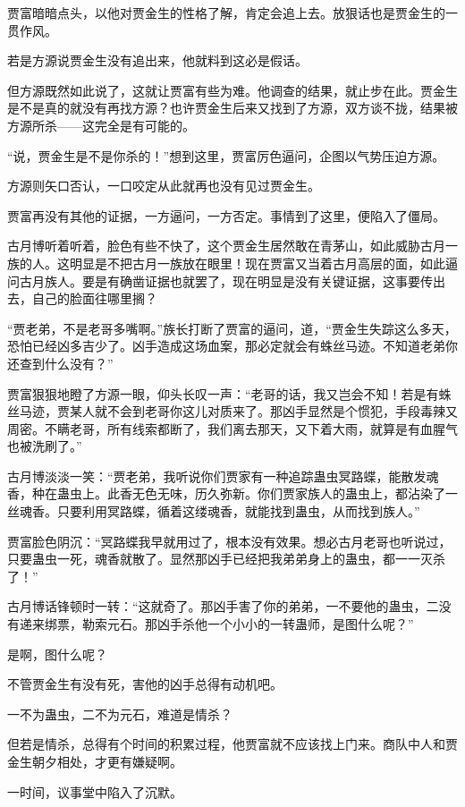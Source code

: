 \begin{this_body}
贾富暗暗点头，以他对贾金生的性格了解，肯定会追上去。放狠话也是贾金生的一贯作风。

若是方源说贾金生没有追出来，他就料到这必是假话。

但方源既然如此说了，这就让贾富有些为难。他调查的结果，就止步在此。贾金生是不是真的就没有再找方源？也许贾金生后来又找到了方源，双方谈不拢，结果被方源所杀——这完全是有可能的。

“说，贾金生是不是你杀的！”想到这里，贾富厉色逼问，企图以气势压迫方源。

方源则矢口否认，一口咬定从此就再也没有见过贾金生。

贾富再没有其他的证据，一方逼问，一方否定。事情到了这里，便陷入了僵局。

古月博听着听着，脸色有些不快了，这个贾金生居然敢在青茅山，如此威胁古月一族的人。这明显是不把古月一族放在眼里！现在贾富又当着古月高层的面，如此逼问古月族人。要是有确凿证据也就罢了，现在明显是没有关键证据，这事要传出去，自己的脸面往哪里搁？

“贾老弟，不是老哥多嘴啊。”族长打断了贾富的逼问，道，“贾金生失踪这么多天，恐怕已经凶多吉少了。凶手造成这场血案，那必定就会有蛛丝马迹。不知道老弟你还查到什么没有？”

贾富狠狠地瞪了方源一眼，仰头长叹一声：“老哥的话，我又岂会不知！若是有蛛丝马迹，贾某人就不会到老哥你这儿对质来了。那凶手显然是个惯犯，手段毒辣又周密。不瞒老哥，所有线索都断了，我们离去那天，又下着大雨，就算是有血腥气也被洗刷了。”

古月博淡淡一笑：“贾老弟，我听说你们贾家有一种追踪蛊虫冥路蝶，能散发魂香，种在蛊虫上。此香无色无味，历久弥新。你们贾家族人的蛊虫上，都沾染了一丝魂香。只要利用冥路蝶，循着这缕魂香，就能找到蛊虫，从而找到族人。”

贾富脸色阴沉：“冥路蝶我早就用过了，根本没有效果。想必古月老哥也听说过，只要蛊虫一死，魂香就散了。显然那凶手已经把我弟弟身上的蛊虫，都一一灭杀了！”

古月博话锋顿时一转：“这就奇了。那凶手害了你的弟弟，一不要他的蛊虫，二没有递来绑票，勒索元石。那凶手杀他一个小小的一转蛊师，是图什么呢？”

是啊，图什么呢？

不管贾金生有没有死，害他的凶手总得有动机吧。

一不为蛊虫，二不为元石，难道是情杀？

但若是情杀，总得有个时间的积累过程，他贾富就不应该找上门来。商队中人和贾金生朝夕相处，才更有嫌疑啊。

一时间，议事堂中陷入了沉默。


\end{this_body}
